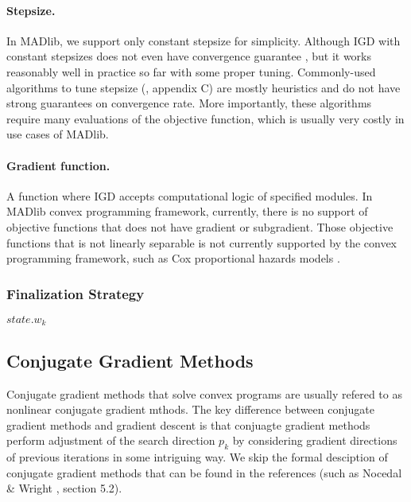 \paragraph{Stepsize.}
In MADlib, we support only constant stepsize for simplicity.
Although IGD with constant stepsizes does not even have convergence guarantee \cite{springerlink:10.1007/s10107-011-0472-0}, but it works reasonably well in practice so far \cite{DBLP:conf/sigmod/FengKRR12} with some proper tuning.
Commonly-used algorithms to tune stepsize (\cite{bertsekas1999nonlinear}, appendix C) are mostly heuristics and do not have strong guarantees on convergence rate.
More importantly, these algorithms require many evaluations of the objective function, which is usually very costly in use cases of MADlib.

\paragraph{Gradient function.}
A function where IGD accepts computational logic of specified modules.
In MADlib convex programming framework, currently, there is no support of objective functions that does not have gradient or subgradient.
Those objective functions that is not linearly separable is not currently supported by the convex programming framework, such as Cox proportional hazards models \cite{Cox1972}.

\subsubsection{Finalization Strategy}
\begin{algorithm} \label{alg:finalization-igd}
\begin{algorithmic}[1]
    \State \Return $\mathit{state}.w_k$
\end{algorithmic}
\end{algorithm}

\subsection{Conjugate Gradient Methods}
Conjugate gradient methods that solve convex programs are usually refered to as nonlinear conjugate gradient mthods.
The key difference between conjugate gradient methods and gradient descent is that conjuagte gradient methods perform adjustment of the search direction $p_k$ by considering gradient directions of previous iterations in some intriguing way.
We skip the formal desciption of conjugate gradient methods that can be found in the references (such as Nocedal \& Wright \cite{nocedal2006numerical}, section 5.2). 

